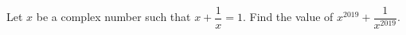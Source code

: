 Let $x$ be a complex number such that $x+\dfrac{1}{x}=1$. Find the value of $x^{2019}+\dfrac{1}{x^{2019}}$.

